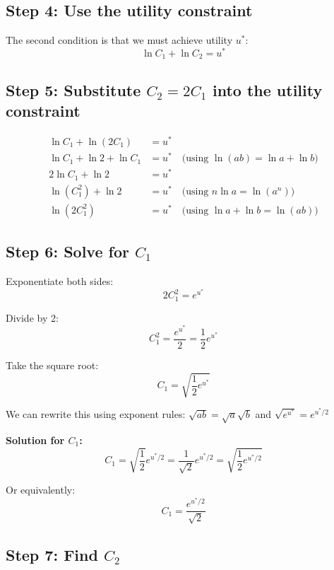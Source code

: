 \documentclass[12pt]{article}
\begin{document}
\newpage

\subsection*{Step 4: Use the utility constraint}

The second condition is that we must achieve utility $u^*$:
\[\ln C_1 + \ln C_2 = u^*\]

\subsection*{Step 5: Substitute $C_2 = 2C_1$ into the utility constraint}

\begin{align*}
\ln C_1 + \ln(2C_1) &= u^* \\
\ln C_1 + \ln 2 + \ln C_1 &= u^* \quad \text{(using } \ln(ab) = \ln a + \ln b\text{)} \\
2\ln C_1 + \ln 2 &= u^* \\
\ln(C_1^2) + \ln 2 &= u^* \quad \text{(using } n\ln a = \ln(a^n)\text{)} \\
\ln(2C_1^2) &= u^* \quad \text{(using } \ln a + \ln b = \ln(ab)\text{)}
\end{align*}

\subsection*{Step 6: Solve for $C_1$}

Exponentiate both sides:
\[2C_1^2 = e^{u^*}\]

Divide by 2:
\[C_1^2 = \frac{e^{u^*}}{2} = \frac{1}{2}e^{u^*}\]

Take the square root:
\[C_1 = \sqrt{\frac{1}{2}e^{u^*}}\]

We can rewrite this using exponent rules: $\sqrt{ab} = \sqrt{a}\sqrt{b}$ and $\sqrt{e^{u^*}} = e^{u^*/2}$

\begin{tcolorbox}[colback=yellow!20!white,colframe=orange!75!black]
\textbf{Solution for $C_1$:}
\[C_1 = \sqrt{\frac{1}{2}}e^{u^*/2} = \frac{1}{\sqrt{2}}e^{u^*/2} = \boxed{\sqrt{\frac{1}{2}e^{u^*/2}}}\]

Or equivalently:
\[\boxed{C_1 = \frac{e^{u^*/2}}{\sqrt{2}}}\]
\end{tcolorbox}

\newpage

\subsection*{Step 7: Find $C_2$}
\end{document}
